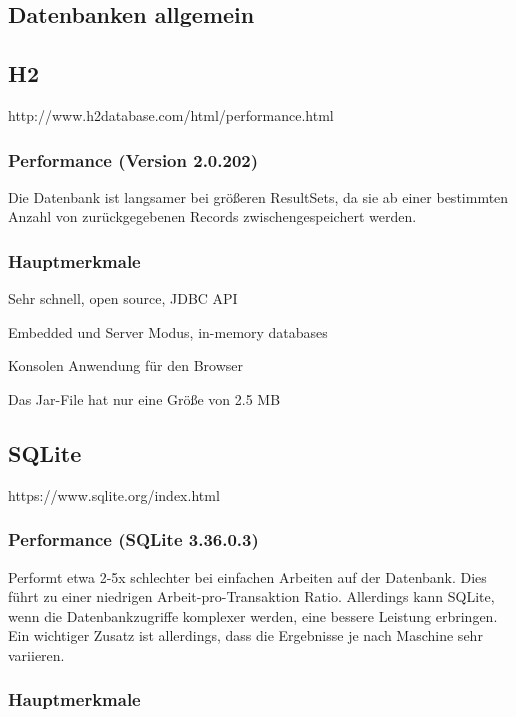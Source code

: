 \subsection{Datenbanken allgemein}


\subsection{H2}
http://www.h2database.com/html/performance.html

\subsubsection{Performance (Version 2.0.202)}
Die Datenbank ist langsamer bei größeren ResultSets, da sie ab einer bestimmten Anzahl von zurückgegebenen Records zwischengespeichert werden.

\subsubsection{Hauptmerkmale}

\begin{compactitem}
    \item Sehr schnell, open source, JDBC API 
    \item Embedded und Server Modus, in-memory databases         
    \item Konsolen Anwendung für den Browser
    \item Das Jar-File hat nur eine Größe von 2.5 MB
\end{compactitem}

\subsection{SQLite}
https://www.sqlite.org/index.html 

\subsubsection{Performance (SQLite 3.36.0.3)}
Performt etwa 2-5x schlechter bei einfachen Arbeiten auf der Datenbank. Dies führt zu einer niedrigen Arbeit-pro-Transaktion Ratio. Allerdings kann SQLite, wenn die Datenbankzugriffe komplexer werden, eine bessere Leistung erbringen. Ein wichtiger Zusatz ist allerdings, dass die Ergebnisse je nach Maschine sehr variieren. 

\subsubsection{Hauptmerkmale}


